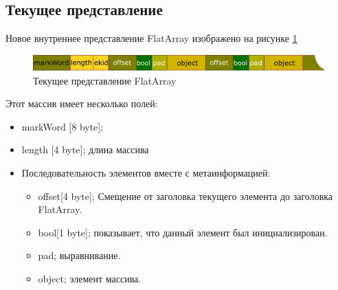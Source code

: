 \subsection{Текущее представление}
Новое внутреннее представление FlatArray изображено на рисунке \ref{last-fa}
\begin{figure}[h]
	\caption{Текущее представление FlatArray}\label{last-fa}
	\includegraphics[width=0.95\linewidth]{image/flat-array-without-sentinel.png}
\end{figure}
Этот массив имеет несколько полей:
\begin{itemize}
	\item markWord [8 byte]; 
	\item length [4 byte]; длина массива
	\item Последовательность элементов вместе с метаинформацией:
		\begin{itemize}
			\item offset[4 byte]; Смещение от заголовка текущего элемента до заголовка FlatArray.
			\item bool[1 byte]; показывает, что данный элемент был инициализирован.
			\item pad; выравнивание.
			\item object; элемент массива.
		\end{itemize}
\end{itemize}

\clearpage